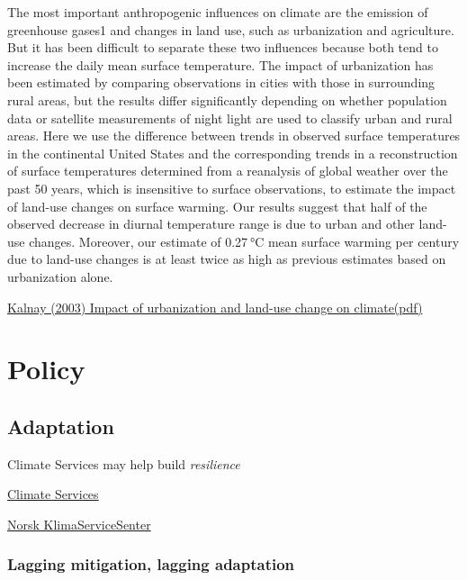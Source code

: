\documentclass[
]{book}
\begin{document}
The most important anthropogenic influences on climate are the emission of greenhouse gases1 and changes in land use, such as urbanization and agriculture. But it has been difficult to separate these two influences because both tend to increase the daily mean surface temperature. The impact of urbanization has been estimated by comparing observations in cities with those in surrounding rural areas, but the results differ significantly depending on whether population data or satellite measurements of night light are used to classify urban and rural areas. Here we use the difference between trends in observed surface temperatures in the continental United States and the corresponding trends in a reconstruction of surface temperatures determined from a reanalysis of global weather over the past 50 years, which is insensitive to surface observations, to estimate the impact of land-use changes on surface warming. Our results suggest that half of the observed decrease in diurnal temperature range is due to urban and other land-use changes. Moreover, our estimate of 0.27 °C mean surface warming per century due to land-use changes is at least twice as high as previous estimates based on urbanization alone.

\href{https://www.nature.com/articles/nature01675}{Kalnay (2003) Impact of urbanization and land-use change on climate}\href{pdf/Kalnay_2003_Impact_of_Urbanization_and_LUC_on_Climate.pdf}{(pdf)}

\hypertarget{part-policy}{%
\part{Policy}\label{part-policy}}

\hypertarget{adaptation}{%
\chapter{Adaptation}\label{adaptation}}

Climate Services may help build \emph{resilience}

\href{https://gfcs.wmo.int/}{Climate Services}

\href{https://klimaservicesenter.no/faces/desktop/index.xhtml}{Norsk KlimaServiceSenter}

\hypertarget{lagging-mitigation-lagging-adaptation}{%
\section{Lagging mitigation, lagging adaptation}\label{lagging-mitigation-lagging-adaptation}}
\end{document}
